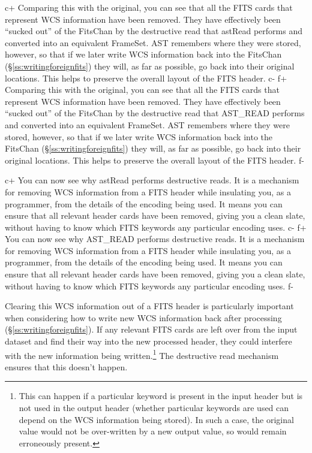 \documentclass[twoside,11pt]{starlink}
\providecommand{\secref}[1]{\S\ref{#1}}
\begin{document}
c+
Comparing this with the original, you can see that all the FITS cards
that represent WCS information have been removed. They have
effectively been ``sucked out'' of the FitsChan by the destructive
read that astRead performs and converted into an equivalent
FrameSet. AST remembers where they were stored, however, so that if we
later write WCS information back into the FitsChan
(\secref{ss:writingforeignfits}) they will, as far as possible, go
back into their original locations. This helps to preserve the overall
layout of the FITS header.
c-
f+
Comparing this with the original, you can see that all the FITS cards
that represent WCS information have been removed. They have
effectively been ``sucked out'' of the FitsChan by the destructive
read that AST\_READ performs and converted into an equivalent
FrameSet. AST remembers where they were stored, however, so that if we
later write WCS information back into the FitsChan
(\secref{ss:writingforeignfits}) they will, as far as possible, go
back into their original locations.  This helps to preserve the
overall layout of the FITS header.
f-

c+
You can now see why astRead performs destructive reads. It is a
mechanism for removing WCS information from a FITS header while
insulating you, as a programmer, from the details of the encoding
being used. It means you can ensure that all relevant header cards
have been removed, giving you a clean slate, without having to know
which FITS keywords any particular encoding uses.
c-
f+
You can now see why AST\_READ performs destructive reads. It is a
mechanism for removing WCS information from a FITS header while
insulating you, as a programmer, from the details of the encoding
being used. It means you can ensure that all relevant header cards
have been removed, giving you a clean slate, without having to know
which FITS keywords any particular encoding uses.
f-

Clearing this WCS information out of a FITS header is particularly
important when considering how to write new WCS information back after
processing (\secref{ss:writingforeignfits}). If any relevant FITS
cards are left over from the input dataset and find their way into the
new processed header, they could interfere with the new information
being written.\footnote{This can happen if a particular keyword is
present in the input header but is not used in the output header
(whether particular keywords are used can depend on the WCS
information being stored). In such a case, the original value would
not be over-written by a new output value, so would remain erroneously
present.} The destructive read mechanism ensures that this doesn't
happen.
\end{document}
